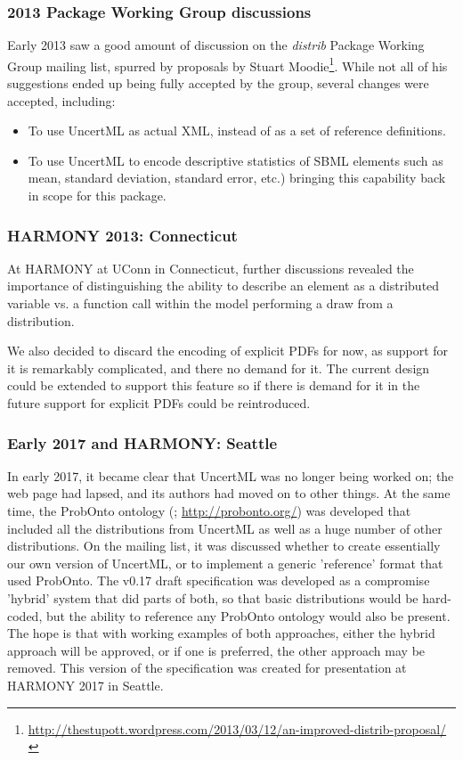 \documentclass[draftspec]{sbmlpkgspec}
\newcommand{\distribshort}{\emph{distrib}\xspace}
\begin{document}
\subsubsection{2013 Package Working Group discussions}

Early 2013 saw a good amount of discussion on the \distribshort Package Working Group mailing list, spurred by proposals by Stuart Moodie\footnote{\url{http://thestupott.wordpress.com/2013/03/12/an-improved-distrib-proposal/}}.  While not all of his suggestions ended up being fully accepted by the group, several changes were accepted, including:

\begin{itemize}
\item To use UncertML as actual XML, instead of as a set of reference definitions.
\item To use UncertML to encode descriptive statistics of SBML elements such as mean, standard deviation, standard error, etc.) bringing this capability back in scope for this package.
\end{itemize}


\subsubsection{HARMONY 2013: Connecticut}

At HARMONY at UConn in Connecticut, further discussions revealed the importance of distinguishing the ability to describe an element as a distributed variable vs. a function call within the model performing a draw from a distribution.

We also decided to discard the encoding of explicit PDFs for now, as
support for it is remarkably complicated, and there no demand for
it. The current design could be extended to support this feature so if
there is demand for it in the future support for explicit PDFs could
be reintroduced.

\subsubsection{Early 2017 and HARMONY: Seattle}

In early 2017, it became clear that UncertML was no longer being worked on; the web page had lapsed, and its authors had moved on to other things.  At the same time, the ProbOnto ontology (\citealt{swat:2016}; \url{http://probonto.org/}) was developed that included all the distributions from UncertML as well as a huge number of other distributions.  On the mailing list, it was discussed whether to create essentially our own version of UncertML, or to implement a generic 'reference' format that used ProbOnto.  The v0.17 draft specification was developed as a compromise 'hybrid' system that did parts of both, so that basic distributions would be hard-coded, but the ability to reference any ProbOnto ontology would also be present.  The hope is that with working examples of both approaches, either the hybrid approach will be approved, or if one is preferred, the other approach may be removed.  This version of the specification was created for presentation at HARMONY 2017 in Seattle.
\end{document}
